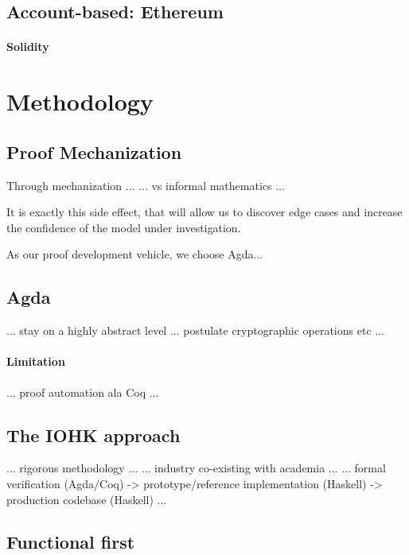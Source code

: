 \documentclass[acmsmall,nonacm=true,screen=true]{acmart}\settopmatter{printfolios=false,printccs=false,printacmref=false}
\newcommand\todocite[0]{}
\begin{document}
\subsection{Account-based: Ethereum}
\paragraph{Solidity}

\section{Methodology}
\label{sec:methodology}

\subsection{Proof Mechanization}
Through mechanization ...
... vs informal mathematics ...

It is exactly this side effect, that will allow us
to discover edge cases and increase the confidence
of the model under investigation.

As our proof development vehicle, we choose Agda\todocite ...

\subsection{Agda}

... stay on a highly abstract level ... postulate cryptographic operations etc ...

\paragraph{Limitation}
... proof automation ala Coq ...



\subsection{The IOHK approach}

... rigorous methodology ...
... industry co-existing with academia ...
... formal verification (Agda/Coq) -> prototype/reference implementation (Haskell) -> production codebase (Haskell) ...

\subsection{Functional first}
\end{document}
